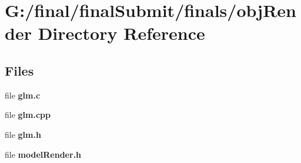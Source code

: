 \section{G\-:/final/final\-Submit/finals/obj\-Render Directory Reference}
\label{dir_e84bf0518ef3e79e2b0fc37628104e6b}
\subsection*{Files}
\begin{DoxyCompactItemize}
\item 
file {\bf glm.\-c}
\item 
file {\bf glm.\-cpp}
\item 
file {\bf glm.\-h}
\item 
file {\bf model\-Render.\-h}
\end{DoxyCompactItemize}
